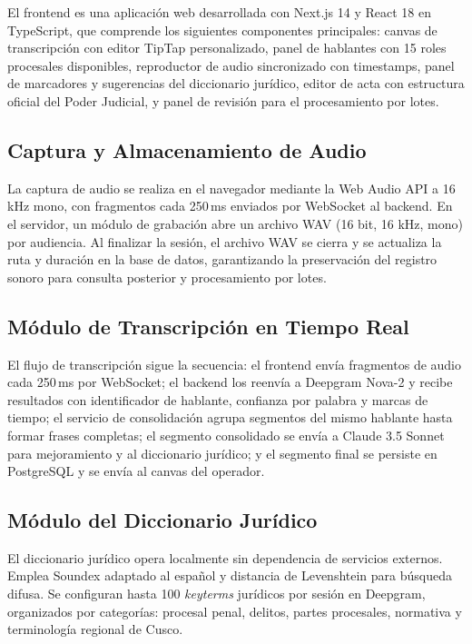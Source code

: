 \documentclass[12pt,a4paper,oneside]{report}
\begin{document}
El frontend es una aplicación web desarrollada con Next.js 14 y React 18 en TypeScript, que comprende los siguientes componentes principales: canvas de transcripción con editor TipTap personalizado, panel de hablantes con 15 roles procesales disponibles, reproductor de audio sincronizado con timestamps, panel de marcadores y sugerencias del diccionario jurídico, editor de acta con estructura oficial del Poder Judicial, y panel de revisión para el procesamiento por lotes.

\subsection{Captura y Almacenamiento de Audio}

La captura de audio se realiza en el navegador mediante la Web Audio API a 16\,kHz mono, con fragmentos cada 250\,ms enviados por WebSocket al backend. En el servidor, un módulo de grabación abre un archivo WAV (16 bit, 16 kHz, mono) por audiencia. Al finalizar la sesión, el archivo WAV se cierra y se actualiza la ruta y duración en la base de datos, garantizando la preservación del registro sonoro para consulta posterior y procesamiento por lotes.

\subsection{Módulo de Transcripción en Tiempo Real}

El flujo de transcripción sigue la secuencia: el frontend envía fragmentos de audio cada 250\,ms por WebSocket; el backend los reenvía a Deepgram Nova-2 y recibe resultados con identificador de hablante, confianza por palabra y marcas de tiempo; el servicio de consolidación agrupa segmentos del mismo hablante hasta formar frases completas; el segmento consolidado se envía a Claude 3.5 Sonnet para mejoramiento y al diccionario jurídico; y el segmento final se persiste en PostgreSQL y se envía al canvas del operador.

\subsection{Módulo del Diccionario Jurídico}

El diccionario jurídico opera localmente sin dependencia de servicios externos. Emplea Soundex adaptado al español y distancia de Levenshtein para búsqueda difusa. Se configuran hasta 100 \textit{keyterms} jurídicos por sesión en Deepgram, organizados por categorías: procesal penal, delitos, partes procesales, normativa y terminología regional de Cusco.
\end{document}
